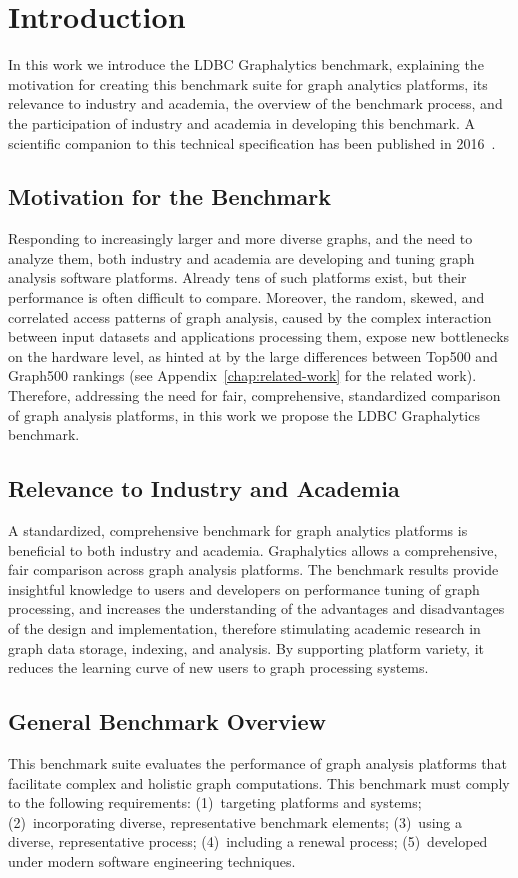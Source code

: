 \chapter{Introduction}
\label{chap:introduction}
In this work we introduce the LDBC Graphalytics benchmark, explaining the motivation for creating this benchmark suite for graph analytics platforms, its relevance to industry and academia, the overview of the benchmark process, and the participation of industry and academia in developing this benchmark. A scientific companion to this technical specification has been published in 2016~\cite{DBLP:journals/pvldb/IosupHNHPMCCSATXNB16}.

\section{Motivation for the Benchmark}
Responding to increasingly larger and more diverse graphs, and the need to analyze them, both industry and academia are developing and tuning graph analysis software platforms. Already tens of such platforms exist,	but their performance is often difficult to compare. Moreover, the random, skewed, and correlated access patterns of graph analysis, caused by the complex interaction between input datasets and applications processing them, expose new bottlenecks on the hardware level, as hinted at by the large differences between Top500 and Graph500 rankings (see Appendix~\ref{chap:related-work} for the related work). Therefore, addressing the need for fair, comprehensive, standardized comparison of graph analysis platforms, in this work we propose the LDBC Graphalytics benchmark.

\section{Relevance to Industry and Academia}
A standardized, comprehensive benchmark for graph analytics platforms is beneficial to both industry and academia. Graphalytics allows a comprehensive, fair comparison across graph analysis platforms. The benchmark results provide insightful knowledge to users and developers on performance tuning of graph processing, and increases the understanding of the advantages and disadvantages of the design and implementation, therefore stimulating academic research in graph data storage, indexing, and analysis. By supporting platform variety, it reduces the learning curve of new users to graph processing systems.

\section{General Benchmark Overview}
This benchmark suite evaluates the performance of graph analysis platforms that facilitate complex and holistic graph computations. This benchmark must comply to the following requirements: (1)~targeting platforms and systems; (2)~incorporating diverse, representative benchmark elements; (3)~using a diverse, representative process; (4)~including a renewal process; (5)~developed under modern software engineering techniques.

